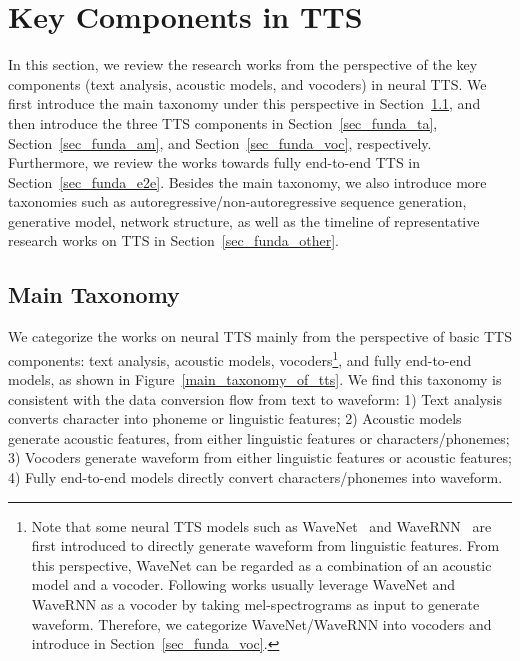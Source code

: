 \documentclass{article}
\begin{document}
\section{Key Components in TTS}
\label{sec_fundamental}

In this section, we review the research works from the perspective of the key components (text analysis, acoustic models, and vocoders) in neural TTS. We first introduce the main taxonomy under this perspective in Section~\ref{sec_funda_taxonomy}, and then introduce the three TTS components in Section~\ref{sec_funda_ta}, Section~\ref{sec_funda_am}, and Section~\ref{sec_funda_voc}, respectively. Furthermore, we review the works towards fully end-to-end TTS in Section~\ref{sec_funda_e2e}. Besides the main taxonomy, we also introduce more taxonomies such as autoregressive/non-autoregressive sequence generation, generative model, network structure, as well as the timeline of representative research works on TTS in Section~\ref{sec_funda_other}.


\subsection{Main Taxonomy}
\label{sec_funda_taxonomy}
We categorize the works on neural TTS mainly from the perspective of basic TTS components: text analysis, acoustic models, vocoders\footnote{Note that some neural TTS models such as WaveNet~\cite{oord2016wavenet} and WaveRNN~\cite{kalchbrenner2018efficient} are first introduced to directly generate waveform from linguistic features. From this perspective, WaveNet can be regarded as a combination of an acoustic model and a vocoder. Following works usually leverage WaveNet and WaveRNN as a vocoder by taking mel-spectrograms as input to generate waveform. Therefore, we categorize WaveNet/WaveRNN into vocoders and introduce in Section~\ref{sec_funda_voc}.}, and fully end-to-end models, as shown in Figure~\ref{main_taxonomy_of_tts}. We find this taxonomy is consistent with the data conversion flow from text to waveform: 1) Text analysis converts character into phoneme or linguistic features; 2) Acoustic models generate acoustic features, from either linguistic features or characters/phonemes; 3) Vocoders generate waveform from either linguistic features or acoustic features; 4) Fully end-to-end models directly convert characters/phonemes into waveform. 
\end{document}
